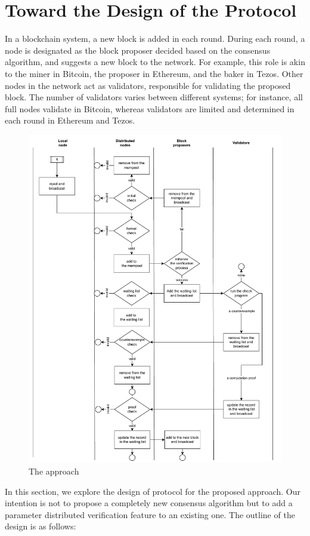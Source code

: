 \documentclass[runningheads]{llncs}
\begin{document}
\section{Toward the Design of the Protocol}
\label{sec:design}
In a blockchain system, a new block is added in each round. During each round, a node is designated as the block proposer decided based on the consensus algorithm, and suggests a new block to the network. For example, this role is akin to the miner in Bitcoin, the proposer in Ethereum, and the baker in Tezos. Other nodes in the network act as validators, responsible for validating the proposed block. The number of validators varies between different systems; for instance, all full nodes validate in Bitcoin, whereas validators are limited and determined in each round in Ethereum and Tezos.
\begin{figure}
\centering
\includegraphics[scale=0.65]{approach}
\caption{The approach}
\label{fig.architect}
\end{figure}
In this section, we explore the design of protocol for the proposed approach. Our intention is not to propose a completely new consensus algorithm but to add a parameter distributed verification feature to an existing one. The outline of the design is as follows:
\end{document}

